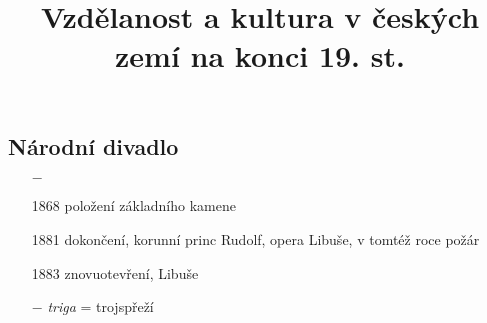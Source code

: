 \documentclass{article}
\title{\vspace{-2cm}Vzdělanost a kultura v českých zemí na konci 19. st.\vspace{-1.7cm}}
\date{}
\author{}
\begin{document}
\maketitle

\subsection*{Národní divadlo}
\begin{itemize}
    \vspace{-0.5em}
    \setlength\itemsep{0.15em}
    \item[$-$] 
    \item[1868] položení základního kamene
    \item[1881] dokončení, korunní princ Rudolf, opera Libuše, v tomtéž roce požár
    \item[1883] znovuotevření, Libuše
    \item[$-$] \textit{triga} = trojspřeží
\end{itemize}
\end{document}
